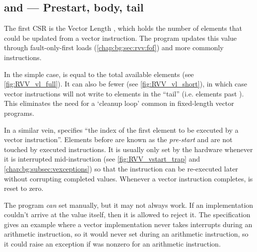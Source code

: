 \subsection{ and  --- Prestart, body, tail}\label{chap:bg:subsec:vlvstart}
The first CSR is the Vector Length , which holds the number of elements that could be updated from a vector instruction.
The program updates this value through fault-only-first loads (\cref{chap:bg:sec:rvv:fof}) and more commonly  instructions.

In the simple case,  is equal to the total available elements (see \cref{fig:RVV_vl_full}).
It can also be fewer (see \cref{fig:RVV_vl_short}), in which case vector instructions will not write to elements in the \enquote{tail} (i.e. elements past ).
This eliminates the need for a `cleanup loop' common in fixed-length vector programs.


In a similar vein,  specifies \enquote{the index of the first element to be executed by a vector instruction}.
Elements before  are known as the \emph{pre-start} and are not touched by executed instructions.
It is usually only set by the hardware whenever it is interrupted mid-instruction (see \cref{fig:RVV_vstart_trap} and \cref{chap:bg:subsec:vexceptions}) so that the instruction can be re-executed later without corrupting completed values.
Whenever a vector instruction completes,  is reset to zero.

The program \emph{can} set  manually, but it may not always work.
If an implementation couldn't arrive at the value itself, then it is allowed to reject it.
The specification gives an example where a vector implementation never takes interrupts during an arithmetic instruction, so it would never set  during an arithmetic instruction, so it could raise an exception if  was nonzero for an arithmetic instruction.


